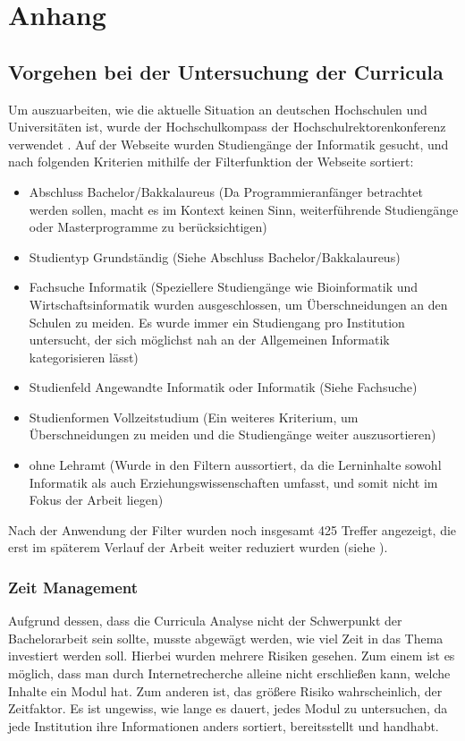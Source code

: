 \clearpage
\section{Anhang}
\label{sec:appendix}

\subsection{Vorgehen bei der Untersuchung der Curricula}
Um auszuarbeiten, wie die aktuelle Situation an deutschen Hochschulen und Universitäten ist, wurde der Hochschulkompass der Hochschulrektorenkonferenz verwendet \cite{hochschulkompass}.
Auf der Webseite wurden Studiengänge der Informatik gesucht, und nach folgenden Kriterien mithilfe der Filterfunktion der Webseite sortiert:

\begin{itemize}
    \item Abschluss Bachelor/Bakkalaureus (Da Programmieranfänger betrachtet werden sollen, macht es im Kontext keinen Sinn, weiterführende Studiengänge oder Masterprogramme zu berücksichtigen)
    \item Studientyp Grundständig (Siehe Abschluss Bachelor/Bakkalaureus)
    \item Fachsuche Informatik (Speziellere Studiengänge wie Bioinformatik und Wirtschaftsinformatik wurden ausgeschlossen, um Überschneidungen an den Schulen zu meiden. Es wurde immer ein Studiengang pro Institution untersucht, der sich möglichst nah an der Allgemeinen Informatik kategorisieren lässt)
    \item Studienfeld Angewandte Informatik oder Informatik (Siehe Fachsuche)
    \item Studienformen Vollzeitstudium (Ein weiteres Kriterium, um Überschneidungen zu meiden und die Studiengänge weiter auszusortieren)
    \item ohne Lehramt (Wurde in den Filtern aussortiert, da die Lerninhalte sowohl Informatik als auch Erziehungswissenschaften umfasst, und somit nicht im Fokus der Arbeit liegen)
\end{itemize}

Nach der Anwendung der Filter wurden noch insgesamt 425 Treffer angezeigt, die erst im späterem Verlauf der Arbeit weiter reduziert wurden (siehe ).

\subsubsection{Zeit Management}\label{sec:time_management}
Aufgrund dessen, dass die Curricula Analyse nicht der Schwerpunkt der Bachelorarbeit sein sollte, musste abgewägt werden, wie viel Zeit in das Thema investiert werden soll.
Hierbei wurden mehrere Risiken gesehen. Zum einem ist es möglich, dass man durch Internetrecherche alleine nicht erschließen kann, welche Inhalte ein Modul hat.
Zum anderen ist, das größere Risiko wahrscheinlich, der Zeitfaktor. Es ist ungewiss, wie lange es dauert, jedes Modul zu untersuchen, da jede Institution ihre Informationen anders sortiert, bereitsstellt und handhabt.

